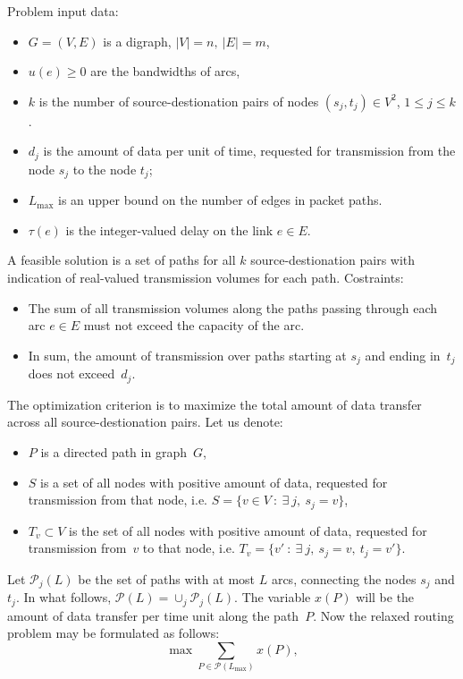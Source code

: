 \documentclass{ifacconf}
\begin{document}
Problem input data:

\begin{itemize}
 \item $G = (V,E)$ is a digraph, $|V|=n, \ |E|=m$,
 \item $u(e)\ge 0$ are the bandwidths of arcs,
 \item $k$ is the number of  source-destionation pairs of nodes $(s_j, t_j)\in V^2$, $1\le j \le k$.
 \item $d_j$ is the amount of data per unit of time, requested for transmission from the node $s_j$ to the node $t_j$;
\item $L_{\max}$ is an upper bound on the number of edges in packet paths.
 \item $\tau(e)$ is the integer-valued delay on the link $e\in E$.
 \end{itemize}

A feasible solution is a set of paths for all $k$ source-destionation pairs with indication of real-valued
transmission volumes for each path. Costraints:
\begin{itemize}
\item The sum of all transmission volumes along the paths passing through each
arc $e\in E$ must not exceed the capacity of the arc.

\item In sum, the amount of transmission over paths starting at $s_j$ and
ending in~$t_j$ does not exceed~$d_j$.
\end{itemize}

The optimization criterion is to maximize the total amount of data transfer across all 
source-destionation pairs. 
Let us denote:

\begin{itemize}
 \item $P$ is a directed path in graph~$G$,
 \item $S$ is a set of all nodes with positive amount of data, requested for transmission from that node, i.e.
$S=\{v\in V\ : \ \exists \ j, \ s_j=v\}$,
 \item $T_v\subset V$ is the set of all nodes with positive amount of data, requested for transmission from~$v$ to that node, i.e.
$T_v=\{v'\ : \ \exists \ j, \ s_j=v,\ t_j=v'\}$.
\end{itemize}

Let ${\mathcal P}_{j}(L)$ be the set of paths with at most  $L$ arcs, connecting the nodes $s_j$ and $t_j$. In what follows, ${\mathcal
P}(L)=\cup_j {\mathcal P}_j(L).$ The variable $x(P)$ will be the amount of data transfer per time unit along the path~$P$. Now the relaxed routing problem may be formulated as follows:
\begin{equation} \label{eqn:crit1}
\max \sum_{P\in {\mathcal P}(L_{\max})} x(P),
\end{equation}
\end{document}
